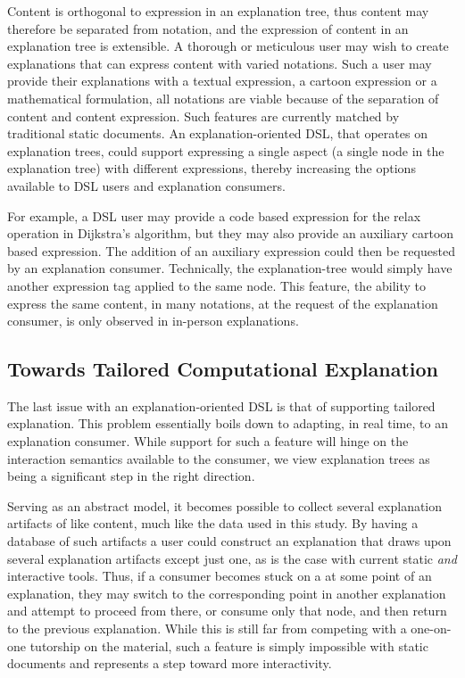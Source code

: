 \documentclass[sigconf]{acmart}
\begin{document}
Content is orthogonal to expression in an explanation tree, thus content may
therefore be separated from notation, and the expression of content in an
explanation tree is extensible. A thorough or meticulous user may wish to create
explanations that can express content with varied notations. Such a user may
provide their explanations with a textual expression, a cartoon expression or a
mathematical formulation, all notations are viable because of the separation of
content and content expression. Such features are currently matched by
traditional static documents. An explanation-oriented DSL, that operates on
explanation trees, could support expressing a single aspect (a single node in
the explanation tree) with different expressions, thereby increasing the options
available to DSL users and explanation consumers.

For example, a DSL user may provide a code based expression for the relax
operation in Dijkstra's algorithm, but they may also provide an auxiliary
cartoon based expression. The addition of an auxiliary expression could then be
requested by an explanation consumer. Technically, the explanation-tree would
simply have another expression tag applied to the same node. This feature, the
ability to express the same content, in many notations, at the request of the
explanation consumer, is only observed in in-person explanations. 

\subsection{Towards Tailored Computational Explanation}
\label{sec:dis:tail}
The last issue with an explanation-oriented DSL is that of supporting tailored
explanation. This problem essentially boils down to adapting, in real time, to
an explanation consumer. While support for such a feature will hinge on the
interaction semantics available to the consumer, we view explanation trees as
being a significant step in the right direction.

Serving as an abstract model, it becomes possible to collect several explanation
artifacts of like content, much like the data used in this study. By having a
database of such artifacts a user could construct an explanation that draws upon
several explanation artifacts except just one, as is the case with current
static \emph{and} interactive tools. Thus, if a consumer becomes stuck on a
at some point of an explanation, they may switch to the corresponding point in
another explanation and attempt to proceed from there, or consume only that
node, and then return to the previous explanation. While this is still far from
competing with a one-on-one tutorship on the material, such a feature is simply
impossible with static documents and represents a step toward more interactivity.
\end{document}
